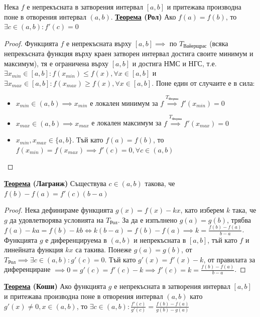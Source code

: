 \documentclass{article}
\begin{document}
Нека $f$ е непрекъсната в затворения интервал $[a, b]$ и притежава производна поне в отворения интервал $(a, b)$. \newline\newline
\textbf{\underline{Теорема} (Рол)} \newline
Ако $f(a) = f(b)$, то $\exists c \in (a, b) : f'(c) = 0$
\begin{proof}
Функцията $f$ е непрекъсната върху $[a, b] \implies $ по $T_{\text{Вайерщрас}}$ (всяка непрекъсната функция върху
краен затворен интервал достига своите минимум и максимум), тя е ограничена върху $[a, b]$ и достига НМС и НГС, т.е. $\exists
x_{min} \in [a, b] : f(x_{min}) \le f(x), \forall x \in [a, b]$ и $\exists x_{max} \in [a, b] : f(x_{max}) \ge f(x), \forall x \in [a, b]$.
Поне един от случаите е в сила:
\begin{itemize}
    \item $x_{min} \in (a, b) \implies x_{min}$ е локален минимум за $f \overset{T_{\text{Ферма}}}{\implies} f'(x_{min}) = 0$
    \item $x_{max} \in (a, b) \implies x_{max}$ е локален максимум за $f \overset{T_{\text{Ферма}}}{\implies} f'(x_{max}) = 0$
    \item $x_{min}, x_{max} \in \{a, b\}$. Тъй като $f(a) = f(b)$, то $f(x_{min}) = f(x_{max}) \implies f'(c) = 0, \forall c \in (a, b)$
\end{itemize}
\end{proof}
\textbf{\underline{Теорема} (Лагранж)} \newline
Съществува $c \in (a, b)$ такова, че $f(b) - f(a) = f'(c)(b - a)$
\begin{proof}
Нека дефинираме функцията $g(x) = f(x) - kx$, като изберем $k$ така, че $g$ да удовлетворява условията на $T_{\text{Рол}}$. За да е изпълнено $g(a) = g(b)$, трябва
$f(a) - ka = f(b) - kb \iff k(b - a) = f(b) - f(a) \implies k = \frac{f(b) - f(a)}{b - a}$. Функцията $g$ е диференцируема в $(a, b)$ и непрекъсната в $[a, b]$, тъй като $f$ и
линейната функция $kx$ са такива. Понеже $g(a) = g(b)$, от $T_{\text{Рол}} \implies \exists c \in (a, b) : g'(c) = 0$. Тъй като $g'(x) = f'(x) - k$, от правилата
за диференциране $\implies 0 = g'(c) = f'(c) - k \implies f'(c) = k = \frac{f(b) - f(a)}{b - a}$.
\end{proof}
\textbf{\underline{Теорема} (Коши)} \newline
Ако функцията $g$ е непрекъсната в затворения интервал $[a, b]$ и притежава производна поне в отворения интервал $(a, b)$
като $g'(x) \neq 0, x \in (a, b)$, то $\exists c \in (a, b) : \frac{f'(c)}{g'(c)} = \frac{f(b) - f(a)}{g(b) - g(a)}$
\end{document}
